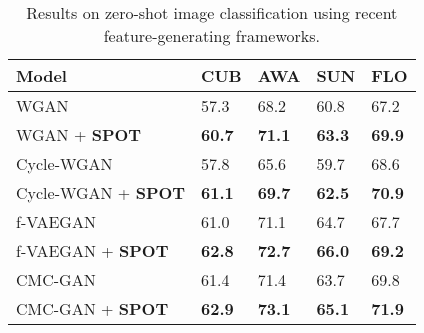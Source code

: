 \documentclass[10pt,twocolumn,letterpaper]{article}
\begin{document}
\setlength{\tabcolsep}{2pt}
\begin{table}[t]
\small
\begin{center}
\begin{tabular}{|l|l|l|l|l|}
\hline
Model                        & CUB  & AWA & SUN  & FLO  \\
\hline \hline
WGAN                         & 57.3 & 68.2 & 60.8 & 67.2 \\
WGAN + \textbf{SPOT}         & \textbf{60.7} & \textbf{71.1} & \textbf{63.3} & \textbf{69.9} \\
\hline
Cycle-WGAN                   & 57.8 & 65.6 & 59.7 & 68.6 \\
Cycle-WGAN + \textbf{SPOT} & \textbf{61.1} & \textbf{69.7} & \textbf{62.5} & \textbf{70.9} \\
\hline
f-VAEGAN & 61.0 & 71.1 & 64.7 & 67.7 \\
f-VAEGAN + \textbf{SPOT} & \textbf{62.8} & \textbf{72.7} & \textbf{66.0} & \textbf{69.2} \\
\hline
CMC-GAN                      & 61.4 & 71.4 & 63.7 & 69.8 \\
CMC-GAN + \textbf{SPOT} & \textbf{62.9} & \textbf{73.1} & \textbf{65.1} & \textbf{71.9} \\
\hline
\end{tabular}
\end{center}
\caption{Results on zero-shot image classification using recent feature-generating frameworks.
}
\label{tbl:results:zsl_image}
\end{table}
\end{document}
